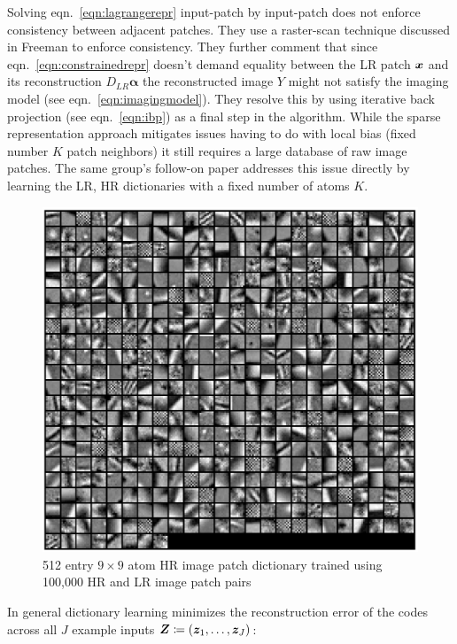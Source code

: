 %
Solving eqn.~\ref{eqn:lagrangerepr} input-patch by input-patch does not enforce consistency between adjacent patches.
%
They use a raster-scan technique discussed in Freeman \etal\cite{freeman2002example} to enforce consistency.
%
They further comment that since eqn.~\ref{eqn:constrainedrepr} doesn't demand equality between the LR patch $\bm{x}$ and its reconstruction $D_{LR}\bm{\alpha}$ the reconstructed image $Y$ might not satisfy the imaging model (see eqn.~\ref{eqn:imagingmodel}).
%
They resolve this by using iterative back projection (see eqn.~\ref{eqn:ibp}) as a final step in the algorithm.
%
While the sparse representation approach mitigates issues having to do with local bias (fixed number $K$ patch neighbors) it still requires a large database of raw image patches.
%
The same group's follow-on paper\cite{yang2010} addresses this issue directly by learning the LR, HR dictionaries with a fixed number of atoms $K$.
\begin{figure}
    \centering
    \includegraphics[width=\linewidth,keepaspectratio]{figures/dictpatches.png}
    \caption{512 entry $9 \times 9$ atom HR image patch dictionary trained using 100,000 HR and LR image patch pairs\cite{yang2010}}
    \label{fig:hrpatchdict}
\end{figure}
%
In general dictionary learning minimizes the reconstruction error of the codes across all $J$ example inputs $\bm{Z} \coloneqq \left( \bm{z}_1, \mathellipsis, \bm{z}_J \right)$:
